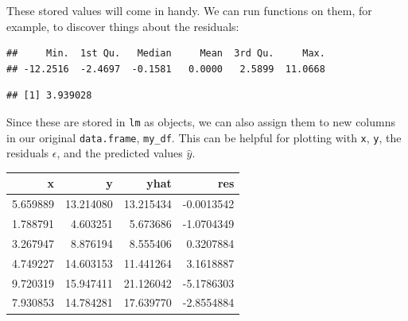 \documentclass[]{book}
\newenvironment{Shaded}{\begin{snugshade}}{\end{snugshade}}
\newcommand{\KeywordTok}[1]{\textcolor[rgb]{0.13,0.29,0.53}{\textbf{#1}}}
\newcommand{\CommentTok}[1]{\textcolor[rgb]{0.56,0.35,0.01}{\textit{#1}}}
\newcommand{\OperatorTok}[1]{\textcolor[rgb]{0.81,0.36,0.00}{\textbf{#1}}}
\newcommand{\NormalTok}[1]{#1}
\theoremstyle{definition}
\theoremstyle{definition}
\theoremstyle{definition}
\theoremstyle{remark}
\begin{document}
These stored values will come in handy. We can run functions on them,
for example, to discover things about the residuals:

\begin{Shaded}
\end{Shaded}

\begin{verbatim}
##     Min.  1st Qu.   Median     Mean  3rd Qu.     Max. 
## -12.2516  -2.4697  -0.1581   0.0000   2.5899  11.0668
\end{verbatim}

\begin{Shaded}
\end{Shaded}

\begin{verbatim}
## [1] 3.939028
\end{verbatim}

Since these are stored in \texttt{lm} as objects, we can also assign
them to new columns in our original \texttt{data.frame},
\texttt{my\_df}. This can be helpful for plotting with \texttt{x},
\texttt{y}, the residuals \(\epsilon\), and the predicted values
\(\hat{y}\).

\begin{Shaded}
\end{Shaded}

\begin{tabular}{r|r|r|r}
\hline
x & y & yhat & res\\
\hline
5.659889 & 13.214080 & 13.215434 & -0.0013542\\
\hline
1.788791 & 4.603251 & 5.673686 & -1.0704349\\
\hline
3.267947 & 8.876194 & 8.555406 & 0.3207884\\
\hline
4.749227 & 14.603153 & 11.441264 & 3.1618887\\
\hline
9.720319 & 15.947411 & 21.126042 & -5.1786303\\
\hline
7.930853 & 14.784281 & 17.639770 & -2.8554884\\
\hline
\end{tabular}
\end{document}
